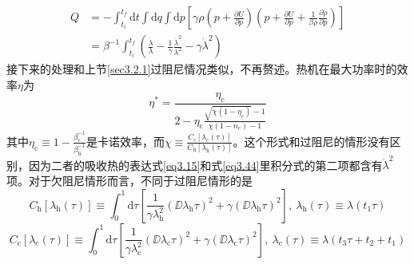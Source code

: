 \begin{equation}
    \begin{split}
        Q &=-\int_{t_i}^{t_f} \mathrm{d} t \int \mathrm{d} q \int \mathrm{d} p\left[\gamma \rho\left(p+\frac{\partial U}{\partial p}\right)\left(p+\frac{\partial U}{\partial p}+\frac{1}{\beta \rho} \frac{\partial \rho}{\partial p}\right)\right]\\
        &=\beta^{-1} \int_{t_i}^{t_f} \left(\frac{\dot{\lambda}}{\lambda}-\frac{1}{\gamma} \frac{\dot{\lambda}^{2}}{\lambda^{2}}-\gamma \dot{\lambda}^{2}\right)
    \end{split}
    \label{eq3.44}
\end{equation}
接下来的处理和上节\ref{sec3.2.1}过阻尼情况类似，不再赘述。热机在最大功率时的效率$\eta$为
\begin{equation}
    \eta^{*}=\frac{\eta_{\mathrm{c}}}{2-\eta_{\mathrm{c}} \frac{\sqrt{\chi\left(1-\eta_{\mathrm{c}}\right)}-1}{\chi\left(1-n_{\mathrm{c}}\right)-1}}
    \label{eq3.45}
\end{equation}
其中$\eta_{\mathrm{c}}\equiv 1-\frac{\beta_{\mathrm{c}}^{-1}}{\beta_{\mathrm{h}}^{-1}}$是卡诺效率，而$\chi\equiv\frac{C_{\mathrm{c}} [\lambda_{\mathrm{c}}(\tau)]}{C_{\mathrm{h}} [\lambda_{\mathrm{h}}(\tau)]}$。这个形式和过阻尼的情形没有区别，因为二者的吸收热的表达式\eqref{eq3.15}和式\eqref{eq3.44}里积分式的第二项都含有$\dot{\lambda}^2$项。对于欠阻尼情形而言，不同于过阻尼情形的是
\begin{equation}
    C_{\mathrm{h}} [\lambda_{\mathrm{h}}(\tau)]\equiv \int_{{0}}^{{1}} \mathrm{d} \tau \left[\frac{1}{\gamma{\lambda_{\mathrm{h}}^{2}}} \left(\DD{{\lambda_{\mathrm{h}}}}{\tau}\right)^{2}+\gamma \left({\DD{\lambda_{\mathrm{h}}}{\tau}}\right)^{2} \right],\ \lambda_{\mathrm{h}}(\tau)\equiv\lambda(t_1 \tau)
    \label{eq3.46}
\end{equation}
\begin{equation}
    C_{\mathrm{c}} [\lambda_{\mathrm{c}}(\tau)]\equiv \int_{{0}}^{{1}} \mathrm{d} \tau \left[\frac{1}{\gamma{\lambda_{\mathrm{c}}^{2}}} \left(\DD{{\lambda_{\mathrm{c}}}}{\tau}\right)^{2}+\gamma \left({\DD{\lambda_{\mathrm{c}}}{\tau}}\right)^{2} \right],\ \lambda_{\mathrm{c}}(\tau)\equiv\lambda(t_3 \tau + t_2 +t_1)
    \label{eq3.46.5}
\end{equation}

